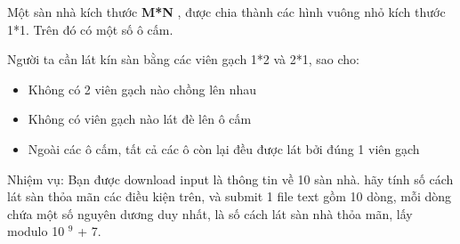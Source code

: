 Một sàn nhà kích thước   \textbf{    M*N   }   , được chia thành các hình vuông nhỏ kích thước 1*1. Trên đó có một số ô cấm.  

   Người ta cần lát kín sàn bằng các viên gạch 1*2 và 2*1, sao cho:  
\begin{itemize}
	\item     Không có 2 viên gạch nào chồng lên nhau   
	\item     Không có viên gạch nào lát đè lên ô cấm   
	\item     Ngoài các ô cấm, tất cả các ô còn lại đều được lát bởi đúng 1 viên gạch   
\end{itemize}

   Nhiệm vụ: Bạn được download input là thông tin về 10 sàn nhà. hãy tính số cách lát sàn thỏa mãn các điều kiện trên, và submit 1 file text gồm 10 dòng, mỗi dòng chứa một số nguyên dương duy nhất, là số cách lát sàn nhà thỏa mãn, lấy modulo 10   $^    9   $   + 7.